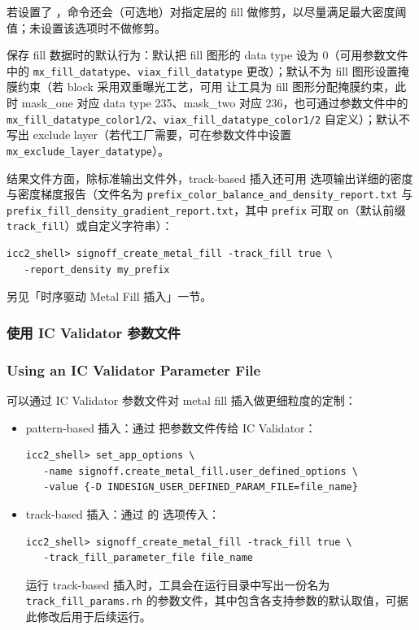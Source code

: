 若设置了 ，命令还会（可选地）对指定层的 fill 做修剪，以尽量满足最大密度阈值；未设置该选项时不做修剪。

保存 fill 数据时的默认行为：默认把 fill 图形的 data type 设为 0（可用参数文件中的 \texttt{mx\_fill\_datatype}、\texttt{viax\_fill\_datatype} 更改）；默认不为 fill 图形设置掩膜约束（若 block 采用双重曝光工艺，可用  让工具为 fill 图形分配掩膜约束，此时 mask\_one 对应 data type 235、mask\_two 对应 236，也可通过参数文件中的 \texttt{mx\_fill\_datatype\_color1/2}、\texttt{viax\_fill\_datatype\_color1/2} 自定义）；默认不写出 exclude layer（若代工厂需要，可在参数文件中设置 \texttt{mx\_exclude\_layer\_datatype}）。

结果文件方面，除标准输出文件外，track-based 插入还可用  选项输出详细的密度与密度梯度报告（文件名为 \texttt{prefix\_color\_balance\_and\_density\_report.txt} 与 \texttt{prefix\_fill\_density\_gradient\_report.txt}，其中 \texttt{prefix} 可取 \texttt{on}（默认前缀 \texttt{track\_fill}）或自定义字符串）：

\begin{lstlisting}
icc2_shell> signoff_create_metal_fill -track_fill true \
   -report_density my_prefix
\end{lstlisting}

\begin{seeAlsoBox}
另见「时序驱动 Metal Fill 插入」一节。
\end{seeAlsoBox}

\subsubsection{使用 IC Validator 参数文件}
\subsubsection*{Using an IC Validator Parameter File}

可以通过 IC Validator 参数文件对 metal fill 插入做更细粒度的定制：
\begin{itemize}
  \item pattern-based 插入：通过  把参数文件传给 IC Validator：
\begin{lstlisting}
icc2_shell> set_app_options \
   -name signoff.create_metal_fill.user_defined_options \
   -value {-D INDESIGN_USER_DEFINED_PARAM_FILE=file_name}
\end{lstlisting}
  \item track-based 插入：通过  的  选项传入：
\begin{lstlisting}
icc2_shell> signoff_create_metal_fill -track_fill true \
   -track_fill_parameter_file file_name
\end{lstlisting}
        运行 track-based 插入时，工具会在运行目录中写出一份名为 \texttt{track\_fill\_params.rh} 的参数文件，其中包含各支持参数的默认取值，可据此修改后用于后续运行。
\end{itemize}

